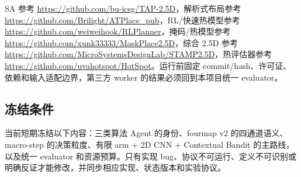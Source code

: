\documentclass[UTF8,a4paper,11pt]{ctexart}
\newcommand{\urlbreak}[1]{\url{#1}}
\begin{document}
    SA 参考 \urlbreak{https://github.com/bu-icsg/TAP-2.5D}，解析式布局参考 \urlbreak{https://github.com/Brilight/ATPlace_pub}，RL/快速热模型参考 \urlbreak{https://github.com/weiweihook/RLPlanner}，掩码/热模型参考 \urlbreak{https://github.com/xunk33333/MaskPlace2.5D}，综合 2.5D 参考 \urlbreak{https://github.com/MicroSystemsDesignLab/STAMP2.5D}，热评估器参考 \urlbreak{https://github.com/uvahotspot/HotSpot}。运行前固定 commit/hash、许可证、依赖和输入适配边界，第三方 worker 的结果必须回到本项目统一 evaluator。

\subsection{冻结条件}

当前短期冻结以下内容：三类算法 Agent 的身份、fourmap v2 的四通道语义、macro-step 的决策粒度、有限 arm + 2D CNN + Contextual Bandit 的主路线，以及统一 evaluator 和资源预算。只有实现 bug、协议不可运行、定义不可识别或明确反证才能修改，并同步相应实现、状态版本和实验协议。
\end{document}
